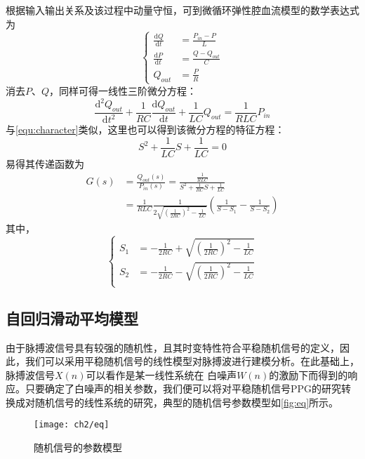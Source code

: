 根据输入输出关系及该过程中动量守恒，可到微循环弹性腔血流模型的数学表达式为
\begin{equation}
    \label{equ:wxh1}
    \left \{
    \begin{aligned}
        \frac{\mathrm{d} Q}{\mathrm{d} t} &=\frac{P_{in}-P}{L}\\
        \frac{\mathrm{d} P}{\mathrm{d} t} &=\frac{Q-Q_{out}}{C}\\
        Q_{out} &=\frac{P}{R}
    \end{aligned}
    \right.
\end{equation}
消去$P$、$Q$，同样可得一线性三阶微分方程：
\begin{equation}
    \label{equ:wxh2}
    \frac{\mathrm{d^2} Q_{out}}{\mathrm{d} t^2}+\frac{1}{RC}\frac{\mathrm{d} Q_{out}}{\mathrm{d} t}+\frac{1}{LC}Q_{out}=\frac{1}{RLC}P_{in}
\end{equation}
与\autoref{equ:character}类似，这里也可以得到该微分方程的特征方程：
\begin{equation}
    \label{equ:character2}
    S^2+\frac{1}{LC}S+\frac{1}{LC}=0
\end{equation}
易得其传递函数为
\begin{equation}
    \label{equ:hs}
    \begin{aligned}
    G(s) &=\frac{Q_{out}(s)}{P_{in}(s)}=\frac{\frac{1}{RLC}}{S^2+\frac{1}{RC}S+\frac{1}{LC}} \\
    &=\frac{1}{RLC}\frac{1}{2\sqrt{(\frac{1}{2RC})^2-\frac{1}{LC}}}(\frac{1}{S-S_{1}}-\frac{1}{S-S_{2}})
    \end{aligned}
\end{equation}
其中，
\begin{equation}
    \label{equ:ss}
    \left \{
    \begin{aligned}
        S_{1} &= -\frac{1}{2RC}+\sqrt{(\frac{1}{2RC})^2-\frac{1}{LC}}\\
        S_{2} &= -\frac{1}{2RC}-\sqrt{(\frac{1}{2RC})^2-\frac{1}{LC}}\\
    \end{aligned}
    \right.
\end{equation}

\subsection{自回归滑动平均模型}
由于脉搏波信号具有较强的随机性，且其时变特性符合平稳随机信号的定义，因此，我们可以采用平稳随机信号的线性模型对脉搏波进行建模分析\cite{TJXHCL,PPGYY,Ma2015}。在此基础上，脉搏波信号$X(n)$可以看作是某一线性系统在
白噪声$W(n)$的激励下而得到的响应。只要确定了白噪声的相关参数，我们便可以将对平稳随机信号PPG的研究转换成对随机信号的线性系统的研究，典型的随机信号参数模型如\autoref{fig:eq}所示。
\begin{figure}[htbp]
    \centering
    \texttt{[image: ch2/eq]}
    \caption{\label{fig:eq}随机信号的参数模型}
\end{figure}

